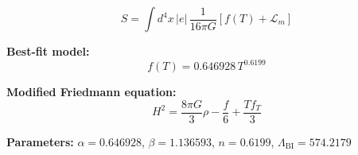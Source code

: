 
\begin{equation}
  S = \int d^4x \, |e| \, \frac{1}{16\pi G} \left[ f(T) + \mathcal{L}_m \right]
\end{equation}

\textbf{Best-fit model:}
\begin{equation}
  f(T) = 0.646928 \, T^{0.6199}
\end{equation}

\textbf{Modified Friedmann equation:}
\begin{equation}
  H^2 = \frac{8\pi G}{3} \rho - \frac{f}{6} + \frac{T f_T}{3}
\end{equation}

\textbf{Parameters:}
$\alpha = 0.646928$, \quad
$\beta = 1.136593$, \quad
$n = 0.6199$, \quad
$\Lambda_{\text{BI}} = 574.2179$